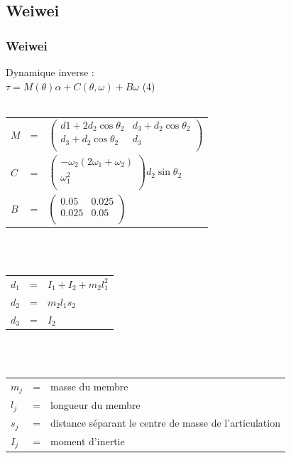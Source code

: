 \documentclass{beamer}
\begin{document}

\subsection{Weiwei}

\begin{frame}
\frametitle{Weiwei}
Dynamique inverse :\\
$\tau = M(\theta)\alpha + C(\theta, \omega) + B\omega $ (4)\\
~\\
\begin{tabular}{lcl}
    $M$ & = &
    $
    \begin{pmatrix}
        d1 + 2 d_2 \cos\theta_2  & d_3 + d_2 \cos \theta_2 \\
        d_3 + d_2 \cos\theta_2 & d_3 \\
    \end{pmatrix}
    $ \\

    $C$ & = &
    $
    \begin{pmatrix}
        -\omega_2 (2 \omega_1 + \omega_2) \\
        \omega_1^2 \\
    \end{pmatrix}
    d_2 \sin\theta_2
    $\\

    $B$ & = &
    $
    \begin{pmatrix}
        0.05  & 0.025 \\
        0.025 & 0.05 \\
    \end{pmatrix}
    $
\end{tabular}\\
~\\
\begin{tabular}{lcl}
    $d_1$ & = & $I_1 + I_2 + m_2 l_1^2$ \\
    $d_2$ & = & $m_2 l_1 s_2$ \\
    $d_3$ & = & $I_2$ \\
\end{tabular}\\
~\\
\begin{tabular}{lcl}
    $m_j$ & = & masse du membre \\
    $l_j$ & = & longueur du membre \\
    $s_{j}$ & = & distance séparant le centre de masse de l'articulation \\
    $I_{j}$ & = & moment d'inertie \\
\end{tabular}\\
\end{frame}
\end{document}
